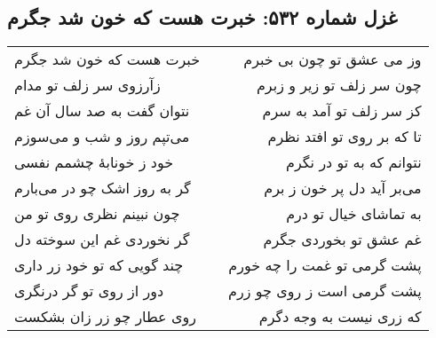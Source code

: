\begin{center}
\section*{غزل شماره ۵۳۲: خبرت هست که خون شد جگرم}
\label{sec:532}
\begin{longtable}{l p{0.5cm} r}
خبرت هست که خون شد جگرم
&&
وز می عشق تو چون بی خبرم
\\
زآرزوی سر زلف تو مدام
&&
چون سر زلف تو زیر و زبرم
\\
نتوان گفت به صد سال آن غم
&&
کز سر زلف تو آمد به سرم
\\
می‌تپم روز و شب و می‌سوزم
&&
تا که بر روی تو افتد نظرم
\\
خود ز خونابهٔ چشمم نفسی
&&
نتوانم که به تو در نگرم
\\
گر به روز اشک چو در می‌بارم
&&
می‌بر آید دل پر خون ز برم
\\
چون نبینم نظری روی تو من
&&
به تماشای خیال تو درم
\\
گر نخوردی غم این سوخته دل
&&
غم عشق تو بخوردی جگرم
\\
چند گویی که تو خود زر داری
&&
پشت گرمی تو غمت را چه خورم
\\
دور از روی تو گر درنگری
&&
پشت گرمی است ز روی چو زرم
\\
روی عطار چو زر زان بشکست
&&
که زری نیست به وجه دگرم
\\
\end{longtable}
\end{center}

